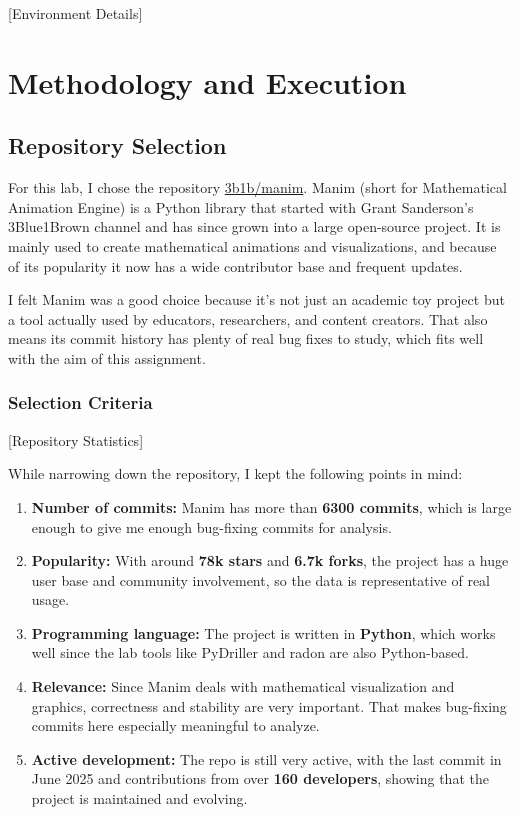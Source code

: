 \documentclass[10pt,a4paper]{report}
\begin{document}
[Environment Details]

\section{Methodology and Execution}

\subsection{Repository Selection}
For this lab, I chose the repository \href{https://github.com/3b1b/manim}{3b1b/manim}. Manim (short for Mathematical Animation Engine) is a Python library that started with Grant Sanderson’s 3Blue1Brown channel and has since grown into a large open-source project. It is mainly used to create mathematical animations and visualizations, and because of its popularity it now has a wide contributor base and frequent updates.

I felt Manim was a good choice because it’s not just an academic toy project but a tool actually used by educators, researchers, and content creators. That also means its commit history has plenty of real bug fixes to study, which fits well with the aim of this assignment.

\subsubsection{Selection Criteria}
[Repository Statistics]

While narrowing down the repository, I kept the following points in mind:
\begin{enumerate}
    \item \textbf{Number of commits:} Manim has more than \textbf{6300 commits}, which is large enough to give me enough bug-fixing commits for analysis.
    \item \textbf{Popularity:} With around \textbf{78k stars} and \textbf{6.7k forks}, the project has a huge user base and community involvement, so the data is representative of real usage.
    \item \textbf{Programming language:} The project is written in \textbf{Python}, which works well since the lab tools like PyDriller and radon are also Python-based.
    \item \textbf{Relevance:} Since Manim deals with mathematical visualization and graphics, correctness and stability are very important. That makes bug-fixing commits here especially meaningful to analyze.
    \item \textbf{Active development:} The repo is still very active, with the last commit in June 2025 and contributions from over \textbf{160 developers}, showing that the project is maintained and evolving.
\end{enumerate}
\end{document}
